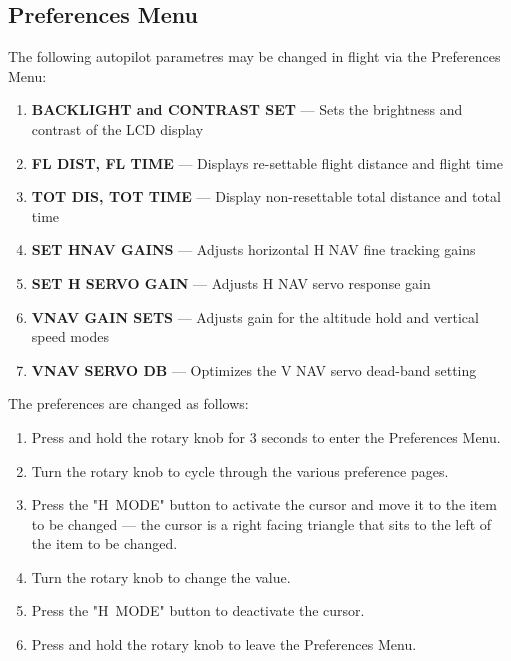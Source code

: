 \subsection*{Preferences Menu}
The following autopilot parametres may be changed in flight via the Preferences Menu:

\begin{enumerate}
\item \textbf{BACKLIGHT and CONTRAST SET} --- Sets the brightness and contrast of the LCD display
\item \textbf{FL DIST, FL TIME} --- Displays re-settable flight distance and flight time
\item \textbf{TOT DIS, TOT TIME} --- Display non-resettable total distance and total time
\item \textbf{SET HNAV GAINS} --- Adjusts horizontal H NAV fine tracking gains
\item \textbf{SET H SERVO GAIN} --- Adjusts H NAV servo response gain
\item \textbf{VNAV GAIN SETS} --- Adjusts gain for the altitude hold and vertical speed modes
\item \textbf{VNAV SERVO DB} --- Optimizes the V NAV servo dead-band setting
\end{enumerate}

The preferences are changed as follows:

\begin{enumerate}
\item Press and hold the rotary knob for 3 seconds to enter the Preferences Menu. 
\item Turn the rotary knob to cycle through the various preference pages.  
\item Press the "H~MODE" button to activate the cursor and move it to the item to be changed --- the cursor is a right facing triangle that sits to the left of the item to be changed. 
\item Turn the rotary knob to change the value.
\item Press the "H~MODE" button to deactivate the cursor.  
\item Press and hold the rotary knob to leave the Preferences Menu.
\end{enumerate}

